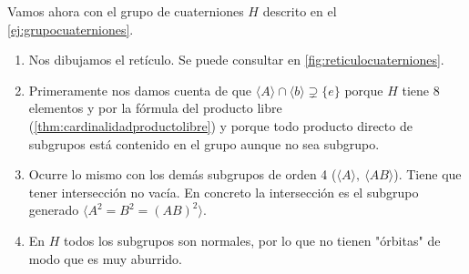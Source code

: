 \begin{ej}
	Vamos ahora con el grupo de cuaterniones $H$ descrito en el \autoref{ej:grupocuaterniones}.
	
	
	
	\begin{enumerate}
		\item Nos dibujamos el retículo. Se puede consultar en \autoref{fig:reticulocuaterniones}.
		\item Primeramente nos damos cuenta de que $\langle A \rangle \cap \langle b \rangle \supsetneq \{e\}$ porque $H$ tiene 8 elementos y por la fórmula del producto libre (\autoref{thm:cardinalidadproductolibre}) y porque todo producto directo de subgrupos está contenido en el grupo aunque no sea subgrupo.
		\item Ocurre lo mismo con los demás subgrupos de orden 4 ($\langle A \rangle,\ \langle AB \rangle$). Tiene que tener intersección no vacía. En concreto la intersección es el subgrupo generado $\langle A^2 = B^2 = (AB)^2 \rangle$.
		\item En $H$ todos los subgrupos son normales, por lo que no tienen "órbitas" de modo que es muy aburrido.
	\end{enumerate}
\end{ej}

